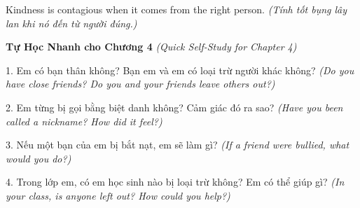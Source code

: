 \begin{baihoc}
Kindness is contagious when it comes from the right person.
\textit{(Tính tốt bụng lây lan khi nó đến từ người đúng.)}
\end{baihoc}

\begin{tuhocnhanh}
\textbf{Tự Học Nhanh cho Chương 4}
\textit{(Quick Self-Study for Chapter 4)}

1. Em có bạn thân không? Bạn em và em có loại trừ người khác không?
\textit{(Do you have close friends? Do you and your friends leave others out?)}

2. Em từng bị gọi bằng biệt danh không? Cảm giác đó ra sao?
\textit{(Have you been called a nickname? How did it feel?)}

3. Nếu một bạn của em bị bắt nạt, em sẽ làm gì?
\textit{(If a friend were bullied, what would you do?)}

4. Trong lớp em, có em học sinh nào bị loại trừ không? Em có thể giúp gì?
\textit{(In your class, is anyone left out? How could you help?)}
\end{tuhocnhanh}

\ngancach
